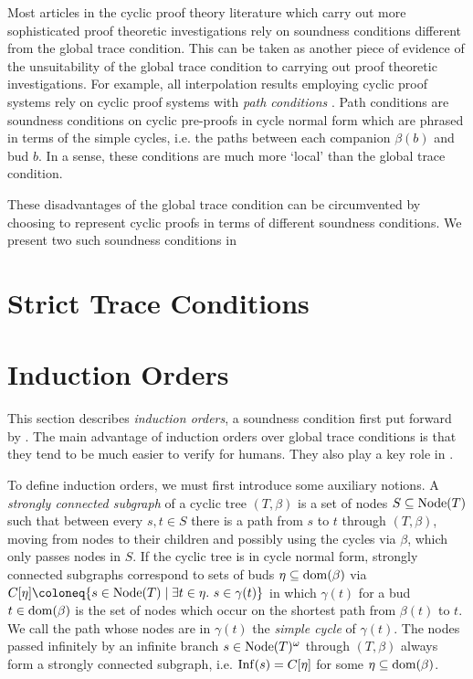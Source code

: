 Most articles in the cyclic proof theory literature which carry out more
sophisticated proof theoretic investigations rely on soundness conditions
different from
the global trace condition.
This can be taken as
another piece of evidence of the unsuitability of the global trace condition to
carrying out proof theoretic investigations.
For example, all interpolation results
employing cyclic proof systems rely on cyclic proof systems with \emph{path conditions}
\parencite[see][]{afshariUniformInterpolationCyclic2021,afshariLyndonInterpolationModal2022,martiFocusSystemAlternationFree2021,shamkanovCircularProofsGodelLob2014,savateevNonWellFoundedProofsGrzegorczyk2018}.
Path conditions are soundness conditions on cyclic
pre-proofs in cycle normal form which are phrased in terms of the simple cycles,
i.e. the paths between each companion $\beta(b)$ and bud $b$. In a sense, these
conditions are much more `local' than the global trace condition.

These disadvantages of the global trace condition can be circumvented by
choosing to represent cyclic proofs in terms of different soundness conditions.
We present two such soundness conditions in 

\section{Strict Trace Conditions}
\label{sec:strict-tcs}


\section{Induction Orders}
\label{sec:ios}

This section describes \emph{induction orders}, a soundness condition first put
forward by \textcite{sprengerGlobalInductionMechanisms2003}. The main advantage
of induction orders over global trace conditions is that they tend to be much
easier to verify for humans. They also play a key role in \papTwo{}.

To define induction orders, we must first introduce some auxiliary notions. A
\emph{strongly connected subgraph} of a cyclic tree $(T, \beta)$ is a set of nodes $S
\subseteq \mathrm{Node}(T)$ such that between every $s, t \in S$ there is a path from
$s$ to $t$ through $(T, \beta)$, moving from nodes to their children and possibly using the cycles via $\beta$, which
only passes nodes in $S$. If the cyclic tree is in cycle normal form, strongly connected subgraphs correspond to sets of buds $\eta \subseteq
\mathrm{dom}(\beta)$ via
\(C[\eta] \coloneq \{s \in \Node(T) \mid \exists t \in \eta.~s \in \gamma(t)\}\)
in which $\gamma(t)$ for a bud $t \in \mathrm{dom}(\beta)$ is the set of nodes which
occur on the shortest path from $\beta(t)$ to $t$. We call the path whose nodes
are in $\gamma(t)$ the \emph{simple cycle} of $\gamma(t)$.
The nodes passed infinitely by an infinite branch $s \in
\mathrm{Node}(T)^\omega$ through $(T, \beta)$ always form a strongly connected subgraph, i.e.
$\mathrm{Inf}(s) = C[\eta]$ for some $\eta \subseteq \mathrm{dom}(\beta)$.

